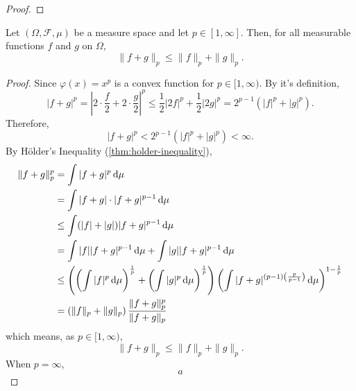\begin{proof}

\end{proof}

\begin{theorem} \label{thm:minkowski-inequality}
	Let $(\Omega,\mathcal{F},\mu)$ be a measure space and let $p\in[1,\infty]$. Then, for all measurable functions $f$ and $g$ on $\Omega$,
	\begin{equation}
		\|f+g\|_{p} \leq\|f\|_{p}+\|g\|_{p}.
	\end{equation}
\end{theorem}

\begin{proof}
	Since $\varphi(x)=x^p$ is a convex function for $p\in[1,\infty)$. By it's definition,
	\begin{equation*}
		|f+g|^{p}=\left|2\cdot\frac{f}{2}+2\cdot\frac{g}{2}\right|^{p}\leq \frac{1}{2}|2f|^p+\frac{1}{2}|2g|^p=2^{p-1}\left(|f|^{p}+|g|^{p}\right).
	\end{equation*}
	Therefore,
	\begin{equation*}
		|f+g|^{p}<2^{p-1}\left(|f|^{p}+|g|^{p}\right)<\infty.
	\end{equation*}
	By H\"older's Inequality (\ref{thm:holder-inequality}),
	\begin{equation*}
		\begin{aligned}
			\|f+g\|_{p}^{p} & =\int|f+g|^{p}\dif\mu                                                                                                                                                                             \\
			                & =\int|f+g| \cdot|f+g|^{p-1}\dif \mu                                                                                                                                                               \\
			                & \leq \int(|f|+|g|)|f+g|^{p-1}\dif\mu                                                                                                                                                              \\
			                & =\int|f||f+g|^{p-1}\dif\mu+\int|g||f+g|^{p-1}\dif\mu                                                                                                                                              \\
			                & \leq\left(\left(\int|f|^{p} \dif \mu\right)^{\frac{1}{p}}+\left(\int|g|^{p} \dif \mu\right)^{\frac{1}{p}}\right)\left(\int|f+g|^{(p-1)\left(\frac{p}{p-1}\right)} \dif \mu\right)^{1-\frac{1}{p}} \\
			                & =\left(\|f\|_{p}+\|g\|_{p}\right) \frac{\|f+g\|_{p}^{p}}{\|f+g\|_{p}}
		\end{aligned}
	\end{equation*}
	which means, as $p\in[1,\infty)$,
	\begin{equation*}
		\|f+g\|_{p} \leq\|f\|_{p}+\|g\|_{p}.
	\end{equation*}
	When $p=\infty$,
	\begin{equation*}
		a
	\end{equation*}
\end{proof}

